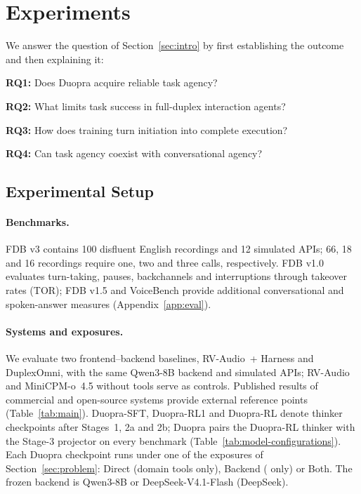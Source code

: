 \section{Experiments}
\label{sec:experiments}



We answer the question of Section~\ref{sec:intro} by first establishing the outcome and then explaining it:


\textbf{RQ1:} Does Duopra acquire reliable task agency?

\textbf{RQ2:} What limits task success in full-duplex interaction agents?

\textbf{RQ3:} How does training turn initiation into complete execution?

\textbf{RQ4:} Can task agency coexist with conversational agency?



\subsection{Experimental Setup}
\label{sec:setup}

\paragraph{Benchmarks.}
FDB v3 \citep{lin2026fdbv3} contains 100 disfluent English recordings and 12 simulated APIs; 66, 18 and 16 recordings require one, two and three calls, respectively.
FDB v1.0 \citep{lin2025fullduplexbench} evaluates turn-taking, pauses, backchannels and interruptions through takeover rates (TOR); FDB v1.5 and VoiceBench provide additional conversational and spoken-answer measures (Appendix~\ref{app:eval}).

\paragraph{Systems and exposures.}
We evaluate two frontend--backend baselines, RV-Audio~+ Harness and DuplexOmni, with the same Qwen3-8B backend and simulated APIs; RV-Audio and MiniCPM-o~4.5 without tools serve as controls.
Published results of commercial and open-source systems provide external reference points (Table~\ref{tab:main}).
Duopra-SFT, Duopra-RL1 and Duopra-RL denote thinker checkpoints after Stages~1, 2a and 2b; Duopra pairs the Duopra-RL thinker with the Stage-3 projector on every benchmark (Table~\ref{tab:model-configurations}).
Each Duopra checkpoint runs under one of the exposures of Section~\ref{sec:problem}: Direct (domain tools only), Backend ( only) or Both.
The frozen backend is Qwen3-8B or DeepSeek-V4.1-Flash (DeepSeek).

